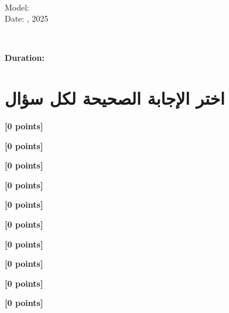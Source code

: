\documentclass[12pt]{article}
\begin{document}
\begin{flushright}
{\Large \textbf{}}\\[0.25em]
{\normalsize \textenglish{Model: }}\\[0.1em]
{\normalsize \textenglish{Date: }{, 2025}}
\end{flushright}

\vspace{0.6cm}

\noindent
\begin{minipage}[t]{0.65\textwidth}
  \raggedright
  \textbf{}\\[0.3em]
\end{minipage}\hfill
\begin{minipage}[t]{0.3\textwidth}
  \raggedleft
  \textenglish{\textbf{Duration: }}
\end{minipage}

\vspace{0.9cm}

\section*{اختر الإجابة الصحيحة لكل سؤال}

\noindent 

\hfill \textbf{[0 points]}\vspace{0.6em}

\noindent 

\hfill \textbf{[0 points]}\vspace{0.6em}

\noindent 

\hfill \textbf{[0 points]}\vspace{0.6em}

\noindent 

\hfill \textbf{[0 points]}\vspace{0.6em}

\noindent 

\hfill \textbf{[0 points]}\vspace{0.6em}

\noindent 

\hfill \textbf{[0 points]}\vspace{0.6em}

\noindent 

\hfill \textbf{[0 points]}\vspace{0.6em}

\noindent 

\hfill \textbf{[0 points]}\vspace{0.6em}

\noindent 

\hfill \textbf{[0 points]}\vspace{0.6em}

\noindent 

\hfill \textbf{[0 points]}\vspace{0.6em}
\end{document}
